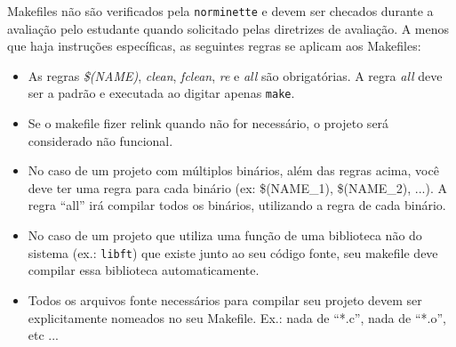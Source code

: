 \documentclass{42-pt}
\begin{document}
            Makefiles não são verificados pela \texttt{norminette} e devem ser checados durante a avaliação pelo
            estudante quando solicitado pelas diretrizes de avaliação. A menos que haja instruções específicas, as seguintes regras
            se aplicam aos Makefiles:
            \begin{itemize}

                \item As regras \textit{\$(NAME)}, \textit{clean}, \textit{fclean}, \textit{re} e \textit{all}
                  são obrigatórias. A regra \textit{all} deve ser a padrão e executada ao digitar apenas \texttt{make}.

                \item Se o makefile fizer relink quando não for necessário, o projeto será considerado
                  não funcional.

                \item No caso de um projeto com múltiplos binários, além das regras acima, você deve ter uma regra para cada binário (ex: \$(NAME\_1), \$(NAME\_2), ...).
                  A regra ``all'' irá compilar todos os binários, utilizando a regra de cada binário.

                \item No caso de um projeto que utiliza uma função de uma biblioteca não do sistema
                  (ex.: \texttt{libft}) que existe junto ao seu código fonte, seu makefile deve compilar
                  essa biblioteca automaticamente.

                \item Todos os arquivos fonte necessários para compilar seu projeto devem
                  ser explicitamente nomeados no seu Makefile. Ex.: nada de ``*.c'', nada de ``*.o'', etc ...

            \end{itemize}
\end{document}
